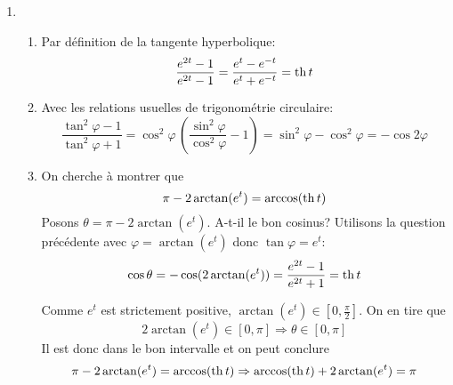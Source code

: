 \begin{enumerate}
 \item \begin{enumerate}
 \item Par définition de la tangente hyperbolique:
\begin{displaymath}
\frac{e^{2t}-1}{e^{2t}-1} = \frac{e^{t}-e^{-t}}{e^{t}+e^{-t}} = \operatorname{th} t
\end{displaymath}

\item Avec les relations usuelles de trigonométrie circulaire:
\begin{displaymath}
\frac{\tan ^{2}\varphi - 1}{\tan ^{2}\varphi+1} = \cos^2\varphi \,(\frac{\sin^2 \varphi}{\cos^2 \varphi} -1)
= \sin^2\varphi - \cos^2 \varphi = -\cos 2\varphi
\end{displaymath}

\item On cherche à montrer que
\begin{displaymath}
  \pi -2\arctan(e^t) = \arccos(\operatorname{th} t)
\end{displaymath}
Posons $\theta = \pi -2\arctan(e^t)$.\newline
A-t-il le bon cosinus?\newline
Utilisons la question pr{\'e}c{\'e}dente avec $\varphi = \arctan(e^t)$ donc $\tan \varphi = e^t$:
\begin{displaymath}
\cos \theta = -\cos (2\arctan (e^{t}))= \frac{e^{2t}-1}{e^{2t}+1}=\operatorname{th} t
\end{displaymath}

Comme $e^{t}$ est strictement positive, $\arctan (e^{t})\in \left[ 0,\frac{\pi }{2}\right]$. On en tire que
\begin{displaymath}
2\arctan (e^{t})\in \left[ 0,\pi \right] \Rightarrow \theta \in \left[ 0,\pi \right] 
\end{displaymath}
Il est donc dans le bon intervalle et on peut conclure
\begin{displaymath}
\pi -2\arctan(e^t) = \arccos(\operatorname{th} t) \Rightarrow  \arccos(\operatorname{th} t) + 2\arctan(e^t) = \pi
\end{displaymath}



\end{enumerate}
\end{enumerate}
